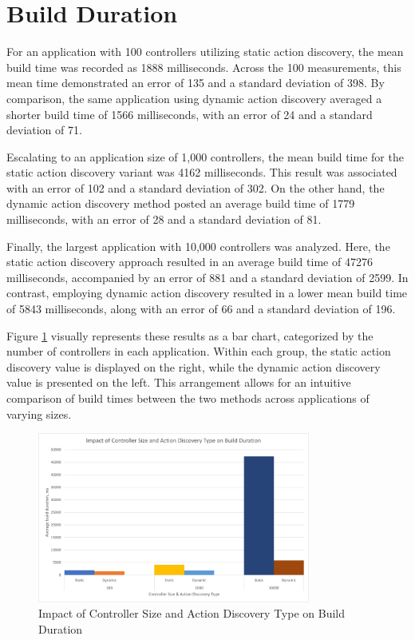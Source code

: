 \section{Build Duration}

For an application with 100 controllers utilizing static action discovery, the mean build time was recorded as 1888 milliseconds. Across the 100 measurements, this mean time demonstrated an error of 135 and a standard deviation of 398. By comparison, the same application using dynamic action discovery averaged a shorter build time of 1566 milliseconds, with an error of 24 and a standard deviation of 71.

Escalating to an application size of 1,000 controllers, the mean build time for the static action discovery variant was 4162 milliseconds. This result was associated with an error of 102 and a standard deviation of 302. On the other hand, the dynamic action discovery method posted an average build time of 1779 milliseconds, with an error of 28 and a standard deviation of 81.

Finally, the largest application with 10,000 controllers was analyzed. Here, the static action discovery approach resulted in an average build time of 47276 milliseconds, accompanied by an error of 881 and a standard deviation of 2599. In contrast, employing dynamic action discovery resulted in a lower mean build time of 5843 milliseconds, along with an error of 66 and a standard deviation of 196.

Figure \ref{fig:build-time-results} visually represents these results as a bar chart, categorized by the number of controllers in each application. Within each group, the static action discovery value is displayed on the right, while the dynamic action discovery value is presented on the left. This arrangement allows for an intuitive comparison of build times between the two methods across applications of varying sizes.

\begin{figure}[H]
\centering
\includegraphics[width=0.8\textwidth]{graphics/Impact of Controller Size and Action Discovery Type on Build Duration.png}
\caption{Impact of Controller Size and Action Discovery Type on Build Duration}
\label{fig:build-time-results}
\end{figure}

